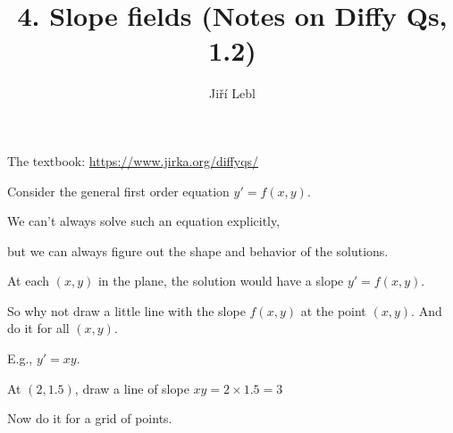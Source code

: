 \documentclass[10pt,aspectratio=169]{beamer}
\author{Ji\v{r}\'i Lebl}
\institute[OSU]{%
Oklahoma State University%
}
\title{4. Slope fields (Notes on Diffy Qs, 1.2)}
\date{}
\begin{document}
\begin{frame}
\titlepage


\begin{center}
The textbook: \url{https://www.jirka.org/diffyqs/}
\end{center}
\end{frame}

\begin{frame}
Consider the general first order equation \quad $y' = f(x,y)$.

\medskip
\pause

We can't always solve such an equation explicitly,

\pause
but we can always figure out the shape and behavior of the solutions.

\medskip
\pause

At each $(x,y)$ in the plane, the solution would have a slope $y' = f(x,y)$.

\medskip
\pause

So why not draw a little line with the slope $f(x,y)$ at the point $(x,y)$.
\pause
And do it for all $(x,y)$.

\medskip

E.g., $y'=xy$. \pause

At $(2,1.5)$, draw a line of slope
$xy = 2 \times 1.5 = 3$

\vspace*{-24pt}
\hspace*{3in}

\vspace*{-1.53in}
\pause
Now do it for a grid of points.

\vspace*{-42pt}
\hspace*{3in}


\end{frame}
\end{document}
